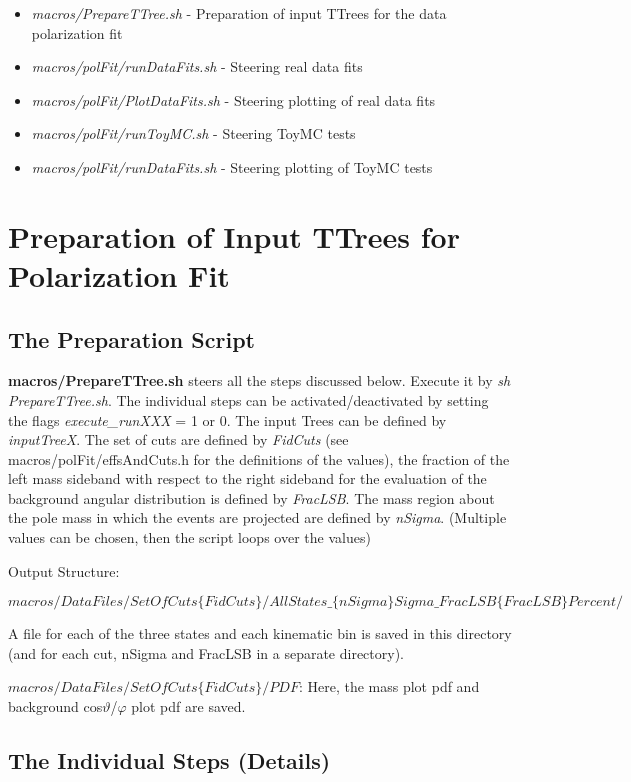 \documentclass{article}
\begin{document}
\begin{itemize}
\item{\emph{macros/PrepareTTree.sh} - Preparation of input TTrees for the data polarization fit}
\item{\emph{macros/polFit/runDataFits.sh} - Steering real data fits}
\item{\emph{macros/polFit/PlotDataFits.sh} - Steering plotting of real data fits}
\item{\emph{macros/polFit/runToyMC.sh} - Steering ToyMC tests}
\item{\emph{macros/polFit/runDataFits.sh} - Steering plotting of ToyMC tests}
\end{itemize}

\section{Preparation of Input TTrees for Polarization Fit}

\subsection{The Preparation Script}  

{\bf macros/PrepareTTree.sh} steers all the steps discussed below. Execute it by \emph{sh PrepareTTree.sh}. The individual steps can be activated/deactivated by setting the flags \emph{execute\_runXXX} = 1 or 0. The input Trees can be defined by \emph{inputTreeX}. The set of cuts are defined by \emph{FidCuts} (see macros/polFit/effsAndCuts.h for the definitions of the values), the fraction of the left mass sideband with respect to the right sideband for the evaluation of the background angular distribution is defined by \emph{FracLSB}. The mass region about the pole mass in which the events are projected are defined by \emph{nSigma}. (Multiple values can be chosen, then the script loops over the values)

Output Structure:

$macros/DataFiles/SetOfCuts\{FidCuts\}/AllStates\_\{nSigma\}Sigma\_FracLSB\{FracLSB\}Percent/$

A file for each of the three states and each kinematic bin is saved in this directory (and for each cut, nSigma and FracLSB in a separate directory). 

$macros/DataFiles/SetOfCuts\{FidCuts\}/PDF$: Here, the mass plot pdf and background cos$\vartheta$/$\varphi$ plot pdf are saved.

\subsection{The Individual Steps (Details)}
\end{document}
